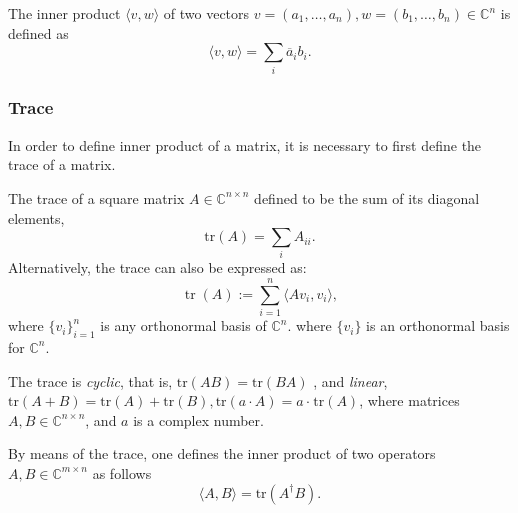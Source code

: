 The inner product $ \langle v, w \rangle$ of two vectors $ v = (a_1, \ldots, a_n ),w = (b_1, \ldots, b_n) \in \mathbb{C}^{n}$ is defined as
\begin{equation*}
  \langle v, w \rangle = \sum_{i} \overline{a}_i b_i. 
\end{equation*}


\subsubsection{Trace}

In order to define inner product of a matrix, it is necessary to first define the trace of a matrix. 

\begin{definition}
  The trace of a square matrix $A\in \mathbb{C}^{n\times n}$ defined to be the sum of its diagonal elements,
\begin{equation*}
  \text{tr}(A)= \sum_{i} A_{ii}.
\end{equation*}
 Alternatively, the trace can also be expressed as:
  \[
    \operatorname{tr}(A) := \sum_{i=1}^n \langle A v_i, v_i \rangle,
  \]
  where $\{v_i\}_{i=1}^n$ is any orthonormal basis of $\mathbb{C}^n$.
where $\{v_i\}$ is an orthonormal basis for $\mathbb{C}^{n}$.

\end{definition}


The trace is \emph{cyclic}, that is, $\text{tr}(AB) = \text{tr}(BA)$ , and \emph{linear}, $\text{tr}(A + B) = \text{tr}(A)+\text{tr}(B), \text{tr}(a \cdot A) = a\cdot \hspace{1pt} \text{tr}(A)$, where matrices $A, B \in \mathbb{C}^{n\times n}$, and $a$ is a complex number.

By means of the trace, one defines the inner product of two operators $A,B\in \mathbb{C}^{m \times n}$ as follows
\begin{equation*} \label{eq:inner_product_matrix}
  \langle A, B \rangle = \text{tr}(A^{\dagger}B).
\end{equation*}

